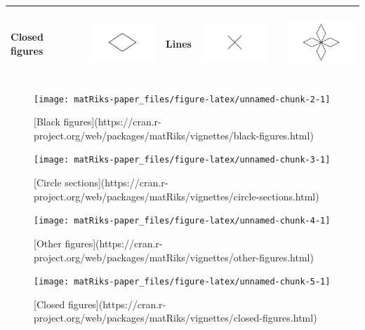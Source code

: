 \begin{table}
\begin{tabular}[t]{l>{}ll>{}ll>{}l}
Closed figures & \includegraphics[width=1in, height=1in]{closed-figures.png} & Lines & \includegraphics[width=1in, height=1in]{lines.png} &  & \includegraphics[width=1in, height=1in]{other-figures.png}\\
\bottomrule
\end{tabular}
\end{table}

\begin{figure}
\texttt{[image: matRiks-paper\_files/figure-latex/unnamed-chunk-2-1]} \caption{[Black figures](https://cran.r-project.org/web/packages/matRiks/vignettes/black-figures.html)}\label{fig:unnamed-chunk-2}
\end{figure}

\begin{figure}
\texttt{[image: matRiks-paper\_files/figure-latex/unnamed-chunk-3-1]} \caption{[Circle sections](https://cran.r-project.org/web/packages/matRiks/vignettes/circle-sections.html)}\label{fig:unnamed-chunk-3}
\end{figure}

\begin{figure}
\texttt{[image: matRiks-paper\_files/figure-latex/unnamed-chunk-4-1]} \caption{[Other figures](https://cran.r-project.org/web/packages/matRiks/vignettes/other-figures.html)}\label{fig:unnamed-chunk-4}
\end{figure}

\begin{figure}
\texttt{[image: matRiks-paper\_files/figure-latex/unnamed-chunk-5-1]} \caption{[Closed figures](https://cran.r-project.org/web/packages/matRiks/vignettes/closed-figures.html)}\label{fig:unnamed-chunk-5}
\end{figure}


